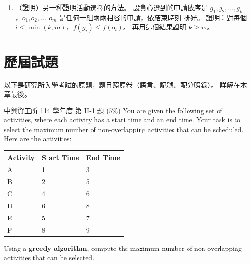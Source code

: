 \begin{enumerate}
\item \label{q:gr-ahead}（證明）另一種證明活動選擇的方法。 設貪心選到的申請依序是
$g_1, g_2, \ldots, g_k$，$o_1, o_2, \ldots, o_m$ 是任何一組兩兩相容的申請，依結束時刻
排好。 證明：對每個 $i \le \min(k, m)$，$f(g_i) \le f(o_i)$。 再用這個結果證明
$k \ge m$。

\end{enumerate}

\section{歷屆試題}
\label{sec:gr-pastexam}

以下是研究所入學考試的原題，題目照原卷（語言、記號、配分照錄）。 詳解在本章最後。

\begin{pastexam}[label={px:gr-1}]{中興資工所 114 學年度 第 II-1 題}
(5\%) You are given the following set of activities, where each activity has a start time and an end time. Your task is to select the maximum number of non-overlapping activities that can be scheduled.\\
Here are the activities:
\begin{center}
\begin{tabular}{|p{4cm}|p{4cm}|p{4cm}|}
\hline
Activity & Start Time & End Time \\ \hline
A & 1 & 3 \\ \hline
B & 2 & 5 \\ \hline
C & 4 & 6 \\ \hline
D & 6 & 8 \\ \hline
E & 5 & 7 \\ \hline
F & 8 & 9 \\ \hline
\end{tabular}
\end{center}
Using a \textbf{greedy algorithm}, compute the maximum number of non-overlapping activities that can be selected.
\end{pastexam}

